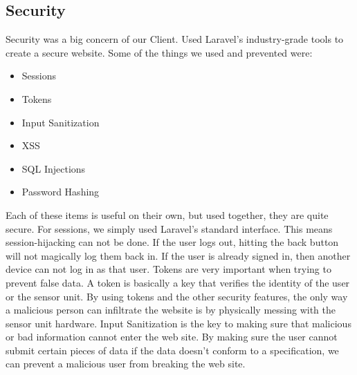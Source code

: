 \documentclass{report}
\begin{document}
\subsection*{Security}
\indent
\indent
Security was a big concern of our Client. Used Laravel's industry-grade tools to create a secure website. Some of the things we used and prevented were:
\begin{itemize}
	\item Sessions
	\item Tokens
	\item Input Sanitization
	\item XSS
	\item SQL Injections
	\item Password Hashing
\end{itemize}
\indent
Each of these items is useful on their own, but used together, they are quite secure.
\newline
\indent
For sessions, we simply used Laravel's standard interface. This means session-hijacking can not be done. If the user logs out, hitting the back button will not magically log them back in. If the user is already signed in, then another device can not log in as that user.
\newline
\indent
Tokens are very important when trying to prevent false data. A token is basically a key that verifies the identity of the user or the sensor unit. By using tokens and the other security features, the only way a malicious person can infiltrate the website is by physically messing with the sensor unit hardware.
\newline
\indent
Input Sanitization is the key to making sure that malicious or bad information cannot enter the web site. By making sure the user cannot submit certain pieces of data if the data doesn't conform to a specification, we can prevent a malicious user from breaking the web site.

\newpage
\end{document}
